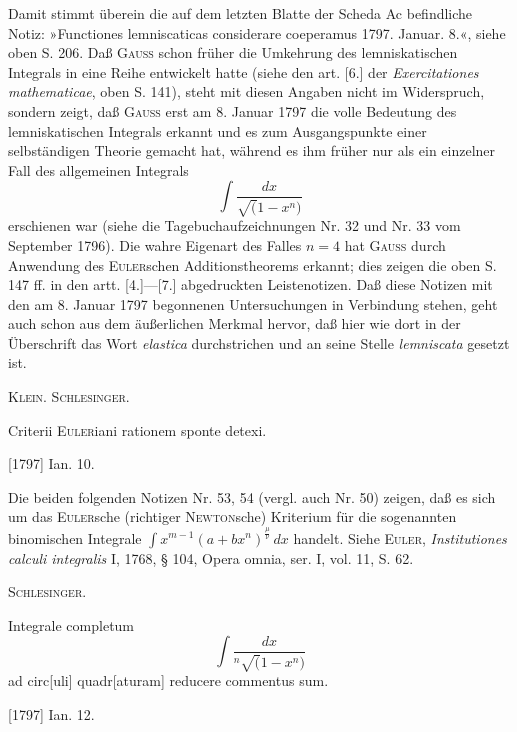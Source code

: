 \medskip\begingroup\small
\indent Damit stimmt überein die auf dem letzten Blatte der Scheda Ac befindliche Notiz: »Functiones lemniscaticas considerare coeperamus 1797. Januar. 8.«, siehe oben S. 206. Daß \textsc{Gauss} schon früher die Umkehrung des lemniskatischen Integrals in eine Reihe entwickelt hatte (siehe den art. [6.] der \textit{Exercitationes mathematicae}, oben S. 141), steht mit diesen Angaben nicht im Widerspruch, sondern zeigt, daß \textsc{Gauss} erst am 8. Januar 1797 die volle Bedeutung des lemniskatischen Integrals erkannt und es zum Ausgangspunkte einer selbständigen Theorie gemacht hat, während es ihm früher nur als ein einzelner Fall des allgemeinen Integrals
\[
\int\frac{dx}{\surd(1-x^n)}
\]
\noindent erschienen war (siehe die Tagebuchaufzeichnungen Nr. 32 und Nr. 33 vom September 1796). Die wahre Eigenart des Falles \(n=4\) hat \textsc{Gauss} durch Anwendung des \textsc{Euler}schen Additionstheorems erkannt; dies zeigen die oben S. 147 ff. in den artt. [4.]—[7.] abgedruckten Leistenotizen. Daß diese Notizen mit den am 8. Januar 1797 begonnenen Untersuchungen in Verbindung stehen, geht auch schon aus dem äußerlichen Merkmal hervor, daß hier wie dort in der Überschrift das Wort \textit{elastica} durchstrichen und an seine Stelle \textit{lemniscata} gesetzt ist.
\par\noindent\hfill\textsc{Klein. Schlesinger.}
\par\endgroup

\indent Criterii \textsc{Euler}iani rationem sponte detexi.
\par\noindent\hfill[1797] Ian. 10.

\medskip\begingroup\small
\indent Die beiden folgenden Notizen Nr. 53, 54 (vergl. auch Nr. 50) zeigen, daß es sich um das \textsc{Euler}sche (richtiger \textsc{Newton}sche) Kriterium für die sogenannten binomischen Integrale \(\int x^{m-1}(a+bx^n)^{\frac\mu\nu}\,dx\) handelt. Siehe \textsc{Euler}, \textit{Institutiones calculi integralis} I, 1768, § 104, Opera omnia, ser. I, vol. 11, S. 62.
\par\noindent\hfill\textsc{Schlesinger.}
\par\endgroup

\clearpage{}
\indent Integrale completum
\[
\int\frac{dx}{{}^{n}\!\surd(1-x^n)}
\]
\noindent ad circ[uli] quadr[aturam] reducere commentus sum.
\par\noindent\hfill[1797] Ian. 12.

